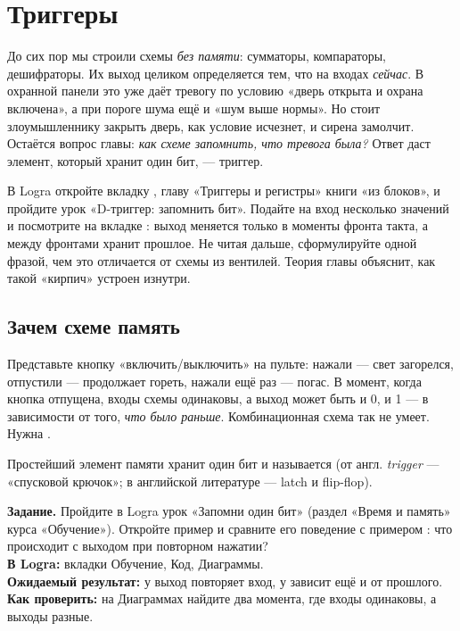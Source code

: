 \chapter{Триггеры}
\label{ch:ff}

До сих пор мы строили схемы \emph{без памяти}: сумматоры, компараторы,
дешифраторы. Их выход целиком определяется тем, что на входах \emph{сейчас}.
В охранной панели это уже даёт тревогу по условию «дверь открыта и охрана
включена», а при пороге шума ещё и «шум выше нормы». Но стоит злоумышленнику
закрыть дверь, как условие исчезнет, и сирена замолчит. Остаётся вопрос главы:
\emph{как схеме запомнить, что тревога была?} Ответ даст элемент, который
хранит один бит, --- триггер.

\begin{buildbox}
В Logra откройте вкладку , главу «Триггеры и регистры» книги
«из блоков», и пройдите урок «D-триггер: запомнить бит». Подайте на вход
несколько значений и посмотрите на вкладке : выход меняется
только в моменты фронта такта, а между фронтами хранит прошлое. Не читая
дальше, сформулируйте одной фразой, чем это отличается от схемы из
вентилей. Теория главы объяснит, как такой «кирпич» устроен изнутри.
\end{buildbox}

\section{Зачем схеме память}

Представьте кнопку «включить/выключить» на пульте: нажали --- свет
загорелся, отпустили --- продолжает гореть, нажали ещё раз --- погас. В момент,
когда кнопка отпущена, входы схемы одинаковы, а выход может быть и 0, и 1 ---
в зависимости от того, \emph{что было раньше}. Комбинационная схема так не
умеет. Нужна .

Простейший элемент памяти хранит один бит и называется 
(от англ. \emph{trigger} --- «спусковой крючок»; в английской литературе ---
latch и flip-flop).

\begin{diybox}
\textbf{Задание.}  Пройдите в Logra урок «Запомни один бит» (раздел
«Время и память» курса «Обучение»).  Откройте пример
 и сравните его поведение с примером : что
происходит с выходом при повторном нажатии?\\
\textbf{В Logra:} вкладки Обучение, Код, Диаграммы.\\
\textbf{Ожидаемый результат:} у  выход повторяет вход,
у  зависит ещё и от прошлого.\\
\textbf{Как проверить:} на Диаграммах найдите два момента, где входы одинаковы,
а выходы разные.
\end{diybox}

